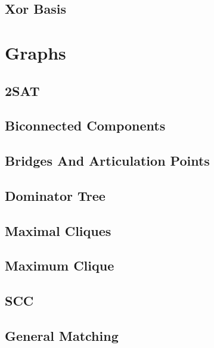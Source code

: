 \subsection{Xor Basis}
\raggedbottom
\hrulefill
\newpage

\section{Graphs}
\subsection{2SAT}
\raggedbottom
\hrulefill
\subsection{Biconnected Components}
\raggedbottom
\hrulefill
\subsection{Bridges And Articulation Points}
\raggedbottom
\hrulefill
\subsection{Dominator Tree}
\raggedbottom
\hrulefill
\subsection{Maximal Cliques}
\raggedbottom
\hrulefill
\subsection{Maximum Clique}
\raggedbottom
\hrulefill
\subsection{SCC}
\raggedbottom
\hrulefill
\subsection{General Matching}
\raggedbottom
\hrulefill
